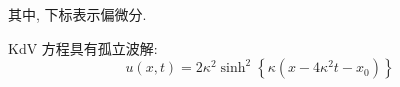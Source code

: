 \documentclass[14pt,a4paper,oneside]{article}
\begin{document}
其中, 下标表示偏微分.

KdV 方程具有孤立波解:
\begin{equation}
    u(x,t)=2\kappa^2\sinh^2\left\{\kappa(x-4\kappa^2t-x_0)\right\}\tag{1.1.3}
    \label{eq:}
\end{equation}




\newpage

\clearpage           %
{}      %
{}   %


\end{document}
